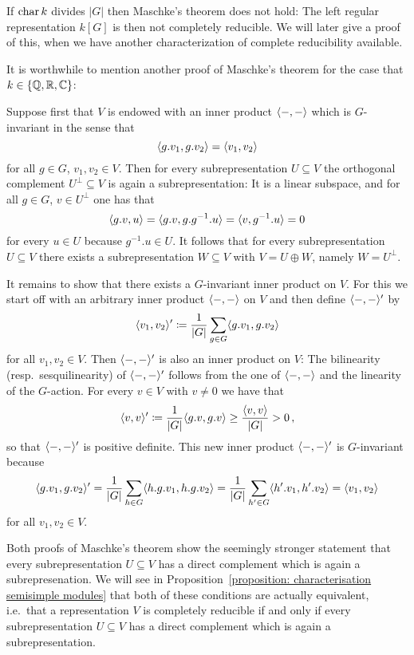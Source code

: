 \begin{warning}
  If $\operatorname{char} k$ divides $|G|$ then Maschke’s theorem does not hold:
  The left regular representation $k[G]$ is then not completely reducible.
  We will later give a proof of this, when we have another characterization of complete reducibility available.
\end{warning}


\begin{fluff}
  \label{fluff: orthogonality proof of Maschke}
  It is worthwhile to mention another proof of Maschke’s theorem for the case that $k \in \{\mathbb{Q}, \mathbb{R}, \mathbb{C}\}$:
  
  Suppose first that $V$ is endowed with an inner product $\langle -,- \rangle$ which is $G$-invariant in the sense that
  \[
      \langle g.v_1, g.v_2 \rangle
    = \langle v_1, v_2 \rangle
  \]
  for all $g \in G$, $v_1, v_2 \in V$.
  Then for every subrepresentation $U \subseteq V$ the orthogonal complement $U^\perp \subseteq V$ is again a subrepresentation:
  It is a linear subspace, and for all $g \in G$, $v \in U^\perp$ one has that
  \[
      \langle g.v, u \rangle
    = \langle g.v, g.g^{-1}.u \rangle
    = \langle v, g^{-1}.u \rangle
    = 0
  \]
  for every $u \in U$ because $g^{-1}.u \in U$.
  It follows that for every subrepresentation $U \subseteq V$ there exists a subrepresentation $W \subseteq V$ with $V = U \oplus W$, namely $W = U^\perp$.
  
  It remains to show that there exists a $G$-invariant inner product on $V$.
  For this we start off with an arbitrary inner product $\langle -,- \rangle$ on $V$ and then define $\langle -,- \rangle'$ by
  \[
              \langle v_1, v_2 \rangle'
    \coloneqq  \frac{1}{|G|} \sum_{g \in G} \langle g.v_1, g.v_2 \rangle
  \]
  for all $v_1, v_2 \in V$.
  Then $\langle -,- \rangle'$ is also an inner product on $V$:
  The bilinearity (resp.\ sesquilinearity) of $\langle -,- \rangle'$ follows from the one of $\langle -,- \rangle$ and the linearity of the $G$-action.
  For every $v \in V$ with $v \neq 0$ we have that
  \[
              \langle v,v \rangle'
    \coloneqq  \frac{1}{|G|} \langle g.v, g.v \rangle
    \geq      \frac{\langle v, v \rangle}{|G|}
    >         0 \,,
  \]
  so that $\langle -,- \rangle'$ is positive definite.
  This new inner product $\langle -,- \rangle'$ is $G$-invariant because
  \[
      \langle g.v_1, g.v_2 \rangle'
    = \frac{1}{|G|} \sum_{h \in G} \langle h.g.v_1, h.g.v_2 \rangle
    = \frac{1}{|G|} \sum_{h' \in G} \langle h'.v_1, h'.v_2 \rangle
    = \langle v_1, v_2 \rangle
  \]
  for all $v_1, v_2 \in V$.
\end{fluff}


\begin{remark}
  Both proofs of Maschke’s theorem show the seemingly stronger statement that every subrepresentation $U \subseteq V$ has a direct complement which is again a subrepresenation.
  We will see in Proposition~\ref{proposition: characterisation semisimple modules} that both of these conditions are actually equivalent, i.e.\ that a representation $V$ is completely reducible if and only if every subrepresentation $U \subseteq V$ has a direct complement which is again a subrepresentation.
\end{remark}



